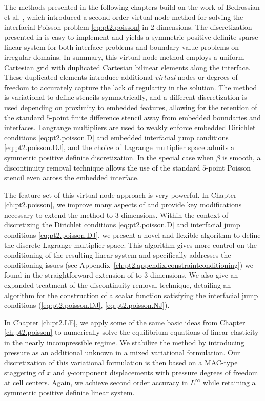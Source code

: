 The methods presented in the following chapters build on the work of Bedrossian et al. \cite{Bedrossian10}, which introduced a second order virtual node method for solving the interfacial Poisson problem \eqref{eq:pt2.poisson} in $2$ dimensions. The discretization presented in \cite{Bedrossian10} is easy to implement and yields a symmetric positive definite sparse linear system for both interface problems and boundary value problems on irregular domains. In summary, this virtual node method employs a uniform Cartesian grid with duplicated Cartesian bilinear elements along the interface. These duplicated elements introduce additional \emph{virtual} nodes or degrees of freedom to accurately capture the lack of regularity in the solution. The method is variational to define stencils symmetrically, and a different discretization is used depending on proximity to embedded features, allowing for the retention of the standard $5$-point finite difference stencil away from embedded boundaries and interfaces. Langrange multipliers are used to weakly enforce embedded Dirichlet conditions \eqref{eq:pt2.poisson.D} and embedded interfacial jump conditions \eqref{eq:pt2.poisson.DJ}, and the choice of Lagrange multiplier space admits a symmetric positive definite discretization. In the special case when $\beta$ is smooth, a discontinuity removal technique allows the use of the standard $5$-point Poisson stencil even across the embedded interface.

The feature set of this virtual node approach is very powerful. In Chapter \ref{ch:pt2.poisson}, we improve many aspects of \cite{Bedrossian10} and provide key modifications necessary to extend the method to $3$ dimensions. Within the context of discretizing the Dirichlet conditions \eqref{eq:pt2.poisson.D} and interfacial jump conditions \eqref{eq:pt2.poisson.DJ}, we present a novel and flexible algorithm to define the discrete Lagrange multiplier space. This algorithm gives more control on the conditioning of the resulting linear system and specifically addresses the conditioning issues (see Appendix~\ref{ch:pt2.appendix.constraintconditioning}) we found in the straightforward extension of \cite{Bedrossian10} to $3$ dimensions. We also give an expanded treatment of the discontinuity removal technique, detailing an algorithm for the construction of a scalar function satisfying the interfacial jump conditions (\ref{eq:pt2.poisson.DJ}, \ref{eq:pt2.poisson.NJ}).

In Chapter \ref{ch:pt2.LE}, we apply some of the same basic ideas from Chapter \ref{ch:pt2.poisson} to numerically solve the equilibrium equations of linear elasticity in the nearly incompressible regime. We stabilize the method by introducing pressure as an additional unknown in a mixed variational formulation. Our discretization of this variational formulation is then based on a MAC-type staggering of $x$ and $y$-component displacements with pressure degrees of freedom at cell centers. Again, we achieve second order accuracy in $L^{\infty}$ while retaining a symmetric positive definite linear system.


